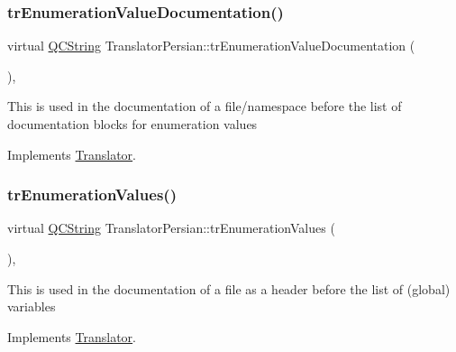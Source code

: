 \mbox{\label{class_translator_persian_afa1fd94d571d0ac09585ddfc004c6473}} 
\subsubsection{\texorpdfstring{trEnumerationValueDocumentation()}{trEnumerationValueDocumentation()}}
{\footnotesize\ttfamily virtual \mbox{\hyperlink{class_q_c_string}{Q\+C\+String}} Translator\+Persian\+::tr\+Enumeration\+Value\+Documentation (\begin{DoxyParamCaption}{ }\end{DoxyParamCaption})\hspace{0.3cm}{\ttfamily [inline]}, {\ttfamily [virtual]}}

This is used in the documentation of a file/namespace before the list of documentation blocks for enumeration values 

Implements \mbox{\hyperlink{class_translator}{Translator}}.

\mbox{\label{class_translator_persian_a24187d5344e024b056f16db59add8af2}} 
\subsubsection{\texorpdfstring{trEnumerationValues()}{trEnumerationValues()}}
{\footnotesize\ttfamily virtual \mbox{\hyperlink{class_q_c_string}{Q\+C\+String}} Translator\+Persian\+::tr\+Enumeration\+Values (\begin{DoxyParamCaption}{ }\end{DoxyParamCaption})\hspace{0.3cm}{\ttfamily [inline]}, {\ttfamily [virtual]}}

This is used in the documentation of a file as a header before the list of (global) variables 

Implements \mbox{\hyperlink{class_translator}{Translator}}.

\mbox{\label{class_translator_persian_a305444c38ce87872d063b91c042aefcf}} 
